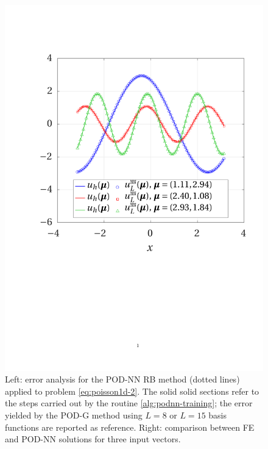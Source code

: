 \documentclass[12pt, a4paper, twoside, openright]{report}
\numberwithin{equation}{chapter}
\theoremstyle{theorem}
\theoremstyle{definition}
\theoremstyle{remark}
\theoremstyle{proposition}
\numberwithin{figure}{chapter}
\begin{document}
\begin{figure}[H]
			\includegraphics[scale = 0.42, trim = {1cm 9cm 1.5cm 3.5cm}, clip]{poisson1d_2_fe_vs_podnn}
			
			\caption{Left: error analysis for the POD-NN RB method (dotted lines) applied to problem \eqref{eq:poisson1d-2}. The solid solid sections refer to the steps carried out by the routine \ref{alg:podnn-training}; the error yielded by the POD-G method using $L = 8$ or $L = 15$ basis functions are reported as reference. Right: comparison between FE and POD-NN solutions for three input vectors.}
			\label{fig:poisson1d-2-fig2}
		\end{figure}
		
\end{document}
